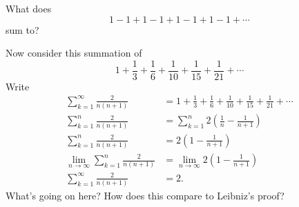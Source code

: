 \documentclass{ximera}
\begin{document}
\begin{question}
What does
\[
1-1+1-1+1-1+1-1+\cdots
\]
sum to?
\end{question}

\begin{question}
Now consider this summation of 
\[
1+ \frac{1}{3} + \frac{1}{6} + \frac{1}{10} + \frac{1}{15} + \frac{1}{21} + \cdots
\]
Write
\begin{align*}
\sum_{k=1}^\infty \frac{2}{n(n+1)} &= 1+ \frac{1}{3} + \frac{1}{6} + \frac{1}{10} + \frac{1}{15} + \frac{1}{21} + \cdots \\
\sum_{k=1}^n \frac{2}{n(n+1)} &= \sum_{k=1}^n 2\left(\frac{1}{n}- \frac{1}{n+1}\right)\\
\sum_{k=1}^n \frac{2}{n(n+1)} &= 2\left(1 - \frac{1}{n+1}\right)\\
\lim_{n\to \infty} \sum_{k=1}^n \frac{2}{n(n+1)} &= \lim_{n\to \infty}2\left(1 - \frac{1}{n+1}\right)\\
\sum_{k=1}^\infty \frac{2}{n(n+1)} &= 2.
\end{align*}
What's going on here? How does this compare to Leibniz's proof?
\end{question}

\end{document}
